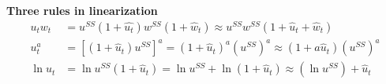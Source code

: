 \documentclass[12pt]{article}
\begin{document}
{\textbf {Three rules in linearization}}
\begin{align*}
u_{t}w_{t}&= u^{SS}(1 +  \widehat{u_{t}})w^{SS}(1 +  \widehat{w}_{t})\approx u^{SS}
w^{SS}(1 +  \widehat{u}_{t} +  \widehat{w}_{t})\\
u^{a}_{t}&= \left[ (1 +  \widehat{u}_{t})u^{SS} \right] ^{a} = (1 +  \widehat{u}_{t})^
{a} \left( u^{SS} \right) ^{a} \approx (1 + a  \widehat{u}_{t})(u^{SS})^{a}\\
\ln u_{t} &= \ln u^{SS}(1 +  \widehat{u}_{t}) = \ln u^{SS} + \ln (1 +  \widehat{u}_{t})
\approx (\ln u^{SS}) +  \widehat{u}_{t}
\end{align*}










%
%
\end{document}
